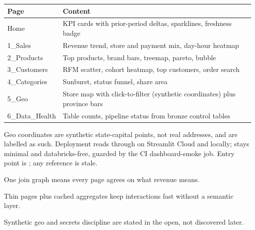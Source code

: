 \begin{center}
\begin{tabular}{l >{\raggedright\arraybackslash}p{10cm}}
\toprule
Page & Content \\
\midrule
Home & KPI cards with prior-period deltas, sparklines, freshness badge \\
1\_Sales & Revenue trend, store and payment mix, day-hour heatmap \\
2\_Products & Top products, brand bars, treemap, pareto, bubble \\
3\_Customers & RFM scatter, cohort heatmap, top customers, order search \\
4\_Categories & Sunburst, status funnel, share area \\
5\_Geo & Store map with click-to-filter (synthetic coordinates) plus province bars \\
6\_Data\_Health & Table counts, pipeline status from bronze control tables \\
\bottomrule
\end{tabular}
\label{tab:dashboard-pages}
\end{center}

Geo coordinates are synthetic state-capital points, not real addresses, and are labelled as such. Deployment reads  through  on Streamlit Cloud and  locally;  stays minimal and databricks-free, guarded by the CI dashboard-smoke job. Entry point is ; any  reference is stale.

\begin{keybox}
\item One join graph means every page agrees on what revenue means.
\item Thin pages plus cached aggregates keep interactions fast without a semantic layer.
\item Synthetic geo and secrets discipline are stated in the open, not discovered later.
\end{keybox}
